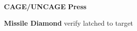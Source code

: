 \begin{checklistenumerate}
{\begin{subenumerate}
        \item \textbf{CAGE/UNCAGE} \dotfill \textbf{Press}
        \item \textbf{Missile Diamond} \dotfill verify latched to target
    \end{subenumerate}}
\end{checklistenumerate}

\clearpage

